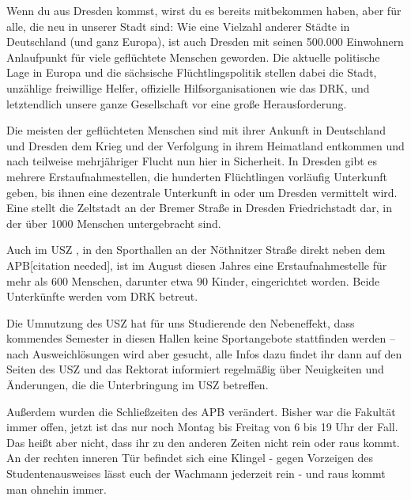 
Wenn du aus Dresden kommst, wirst du es bereits mitbekommen haben, aber für alle, die neu in unserer Stadt sind: Wie eine Vielzahl anderer Städte in Deutschland (und ganz Europa), ist auch Dresden mit seinen 500.000 Einwohnern Anlaufpunkt für viele geflüchtete Menschen geworden. Die aktuelle politische Lage in Europa und die sächsische Flüchtlingspolitik stellen dabei die Stadt, unzählige freiwillige Helfer, offizielle Hilfsorganisationen wie das DRK, und letztendlich unsere ganze Gesellschaft vor eine große Herausforderung. 

Die meisten der geflüchteten Menschen sind mit ihrer Ankunft in Deutschland und Dresden dem Krieg und der Verfolgung in ihrem Heimatland entkommen und nach teilweise mehrjähriger Flucht nun hier in Sicherheit. In Dresden gibt es mehrere Erstaufnahmestellen, die hunderten Flüchtlingen vorläufig Unterkunft geben, bis ihnen eine dezentrale Unterkunft in oder um Dresden vermittelt wird. Eine stellt die Zeltstadt an der Bremer Straße in Dresden Friedrichstadt dar, in der über 1000 Menschen untergebracht sind.

Auch im USZ , in den Sporthallen an der Nöthnitzer Straße direkt neben dem APB[citation needed], ist im August diesen Jahres eine Erstaufnahmestelle für mehr als 600 Menschen, darunter etwa 90 Kinder, eingerichtet worden.   Beide Unterkünfte werden vom DRK  betreut.

Die Umnutzung des USZ hat für uns Studierende den Nebeneffekt, dass kommendes Semester in diesen Hallen keine Sportangebote stattfinden werden – nach Ausweichlösungen wird aber gesucht, alle Infos dazu findet ihr dann auf den Seiten des USZ und das Rektorat informiert regelmäßig über Neuigkeiten und Änderungen, die die Unterbringung im USZ betreffen. 

Außerdem wurden die Schließzeiten des APB verändert. Bisher war die Fakultät immer offen, jetzt ist das nur noch Montag bis Freitag von 6 bis 19 Uhr der Fall. Das heißt aber nicht, dass ihr zu den anderen Zeiten nicht rein oder raus kommt. An der rechten inneren Tür befindet sich eine Klingel - gegen Vorzeigen des Studentenausweises lässt euch der Wachmann jederzeit rein - und raus kommt man ohnehin immer.


